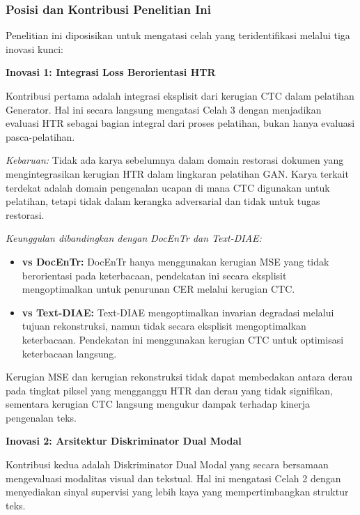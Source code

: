 \documentclass[12pt,a4paper]{article}
\begin{document}
\subsubsection{Posisi dan Kontribusi Penelitian Ini}
\label{subsubsec:research-positioning}

\vspace{1.5ex}

Penelitian ini diposisikan untuk mengatasi celah yang teridentifikasi melalui tiga inovasi kunci:

\textbf{Inovasi 1: Integrasi Loss Berorientasi HTR}

Kontribusi pertama adalah integrasi eksplisit dari kerugian CTC dalam pelatihan Generator. Hal ini secara langsung mengatasi Celah 3 dengan menjadikan evaluasi HTR sebagai bagian integral dari proses pelatihan, bukan hanya evaluasi pasca-pelatihan.

\textit{Kebaruan:} Tidak ada karya sebelumnya dalam domain restorasi dokumen yang mengintegrasikan kerugian HTR dalam lingkaran pelatihan GAN. Karya terkait terdekat adalah domain pengenalan ucapan di mana CTC digunakan untuk pelatihan, tetapi tidak dalam kerangka adversarial dan tidak untuk tugas restorasi.

\textit{Keunggulan dibandingkan dengan  DocEnTr dan Text-DIAE:}
\begin{itemize}
    \item \textbf{vs DocEnTr:} DocEnTr hanya menggunakan kerugian MSE yang tidak berorientasi pada keterbacaan, pendekatan ini secara eksplisit mengoptimalkan untuk penurunan CER melalui kerugian CTC.
    \item \textbf{vs Text-DIAE:} Text-DIAE mengoptimalkan invarian degradasi melalui tujuan rekonstruksi, namun tidak secara eksplisit mengoptimalkan keterbacaan. Pendekatan ini menggunakan kerugian CTC untuk optimisasi keterbacaan langsung.
    
\end{itemize}
Kerugian MSE dan kerugian rekonstruksi tidak dapat membedakan antara derau pada tingkat piksel yang mengganggu HTR dan derau yang tidak signifikan, sementara kerugian CTC langsung mengukur dampak terhadap kinerja pengenalan teks.

\textbf{Inovasi 2: Arsitektur Diskriminator Dual Modal}

Kontribusi kedua adalah Diskriminator Dual Modal yang secara bersamaan mengevaluasi modalitas visual dan tekstual. Hal ini mengatasi Celah 2 dengan menyediakan sinyal supervisi yang lebih kaya yang mempertimbangkan struktur teks.
\end{document}
